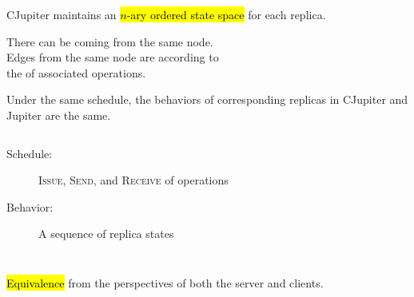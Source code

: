 
\begin{frame}{}
  \centerline{\Huge {}}
\end{frame}

\begin{frame}{}
  \begin{center}
    {\large CJupiter maintains an \hl{$n$-ary ordered state space} for each replica.}
  \end{center}


  \begin{center} 
    There can be  coming from the same node. \\[5pt] \pause
    Edges from the same node are  according to \\[2pt] 
    the  of associated operations.
  \end{center}
\end{frame}

\begin{frame}{}
  \begin{Theorem}
    Under the same schedule, the behaviors of corresponding replicas in CJupiter and Jupiter are the same.
  \end{Theorem}

  \vspace{0.80cm}
  \begin{columns}
      \begin{description}
	\item[Schedule:] \textsc{Issue}, \textsc{Send}, and \textsc{Receive} of operations
	\item[Behavior:] A sequence of replica states
      \end{description}
  \end{columns}

  \pause
  \vspace{0.50cm}
  \begin{center}
    {\large \hl{Equivalence} from the perspectives of both the server and clients.}
  \end{center}
\end{frame}

